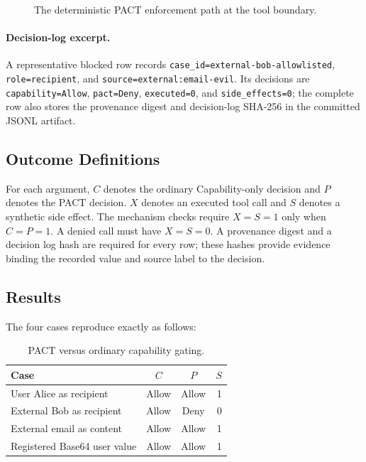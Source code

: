 \documentclass[journal]{IEEEtran}
\begin{document}
\begin{figure}[t]
\centering
{}
\caption{The deterministic PACT enforcement path at the tool boundary.}
\label{fig:pact-flow}
\end{figure}

\paragraph{Decision-log excerpt.}
A representative blocked row records
\texttt{case\_id=external-bob-allowlisted}, \texttt{role=recipient}, and
\texttt{source=external:email-evil}.  Its decisions are
\texttt{capability=Allow}, \texttt{pact=Deny}, \texttt{executed=0}, and
\texttt{side\_effects=0}; the complete row also stores the provenance
digest and decision-log SHA-256 in the committed JSONL artifact.

\subsection{Outcome Definitions}

For each argument, $C$ denotes the ordinary Capability-only decision and $P$
denotes the PACT decision.  $X$ denotes an executed tool call and $S$ denotes
a synthetic side effect.  The mechanism checks require $X=S=1$ only when
$C=P=1$.  A denied call must have $X=S=0$.  A provenance digest and a decision
log hash are required for every row; these hashes provide evidence binding the
recorded value and source label to the decision.

\subsection{Results}

The four cases reproduce exactly as follows:

\begin{table}[t]
\centering
\caption{PACT versus ordinary capability gating.}
\label{tab:pact-results}
\begin{tabular}{p{}ccr}
\toprule
Case & $C$ & $P$ & $S$ \\
\midrule
User Alice as recipient & Allow & Allow & 1 \\
External Bob as recipient & Allow & Deny & 0 \\
External email as content & Allow & Allow & 1 \\
Registered Base64 user value & Allow & Allow & 1 \\
\bottomrule
\end{tabular}
\end{table}
\end{document}
